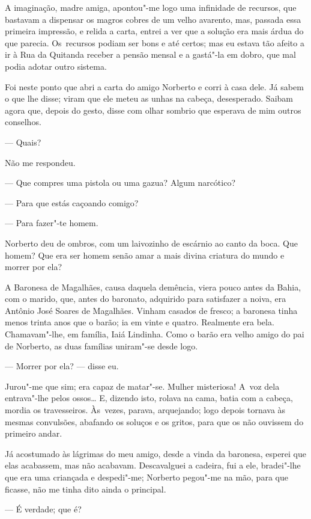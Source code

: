 \begin{linenumbers}
A imaginação, madre amiga, apontou"-me logo uma infinidade de recursos,
que bastavam a dispensar os magros cobres de um velho avarento, mas,
passada essa primeira impressão, e relida a carta, entrei a ver que a
solução era mais árdua do que parecia. Os~recursos podiam ser bons e até
certos; mas eu estava tão afeito a ir à Rua da Quitanda receber a pensão
mensal e a gastá"-la em dobro, que mal podia adotar outro sistema.

Foi neste ponto que abri a carta do amigo Norberto e corri à casa dele.
Já sabem o que lhe disse; viram que ele meteu as unhas na cabeça,
desesperado. Saibam agora que, depois do gesto, disse com olhar sombrio
que esperava de mim outros conselhos.

--- Quais?

Não me respondeu.

--- Que compres uma pistola ou uma gazua? Algum narcótico?

--- Para que estás caçoando comigo?

--- Para fazer"-te homem.

Norberto deu de ombros, com um laivozinho de escárnio ao canto da boca.
Que homem? Que era ser homem senão amar a mais divina criatura do mundo
e morrer por ela?

A Baronesa de Magalhães, causa daquela demência, viera pouco antes da
Bahia, com o marido, que, antes do baronato, adquirido para satisfazer a
noiva, era Antônio José Soares de Magalhães. Vinham casados de fresco; a
baronesa tinha menos trinta anos que o barão; ia em vinte e quatro.
Realmente era bela. Chamavam"-lhe, em família, Iaiá Lindinha. Como o
barão era velho amigo do pai de Norberto, as duas famílias uniram"-se
desde logo.

--- Morrer por ela? --- disse eu.

Jurou"-me que sim; era capaz de matar"-se. Mulher misteriosa! A~voz dela
entrava"-lhe pelos ossos\ldots{} E, dizendo isto, rolava na cama, batia com a
cabeça, mordia os travesseiros. Às~vezes, parava, arquejando; logo
depois tornava às mesmas convulsões, abafando os soluços e os gritos,
para que os não ouvissem do primeiro andar.

Já acostumado às lágrimas do meu amigo, desde a vinda da baronesa,
esperei que elas acabassem, mas não acabavam. Descavalguei a cadeira,
fui a ele, bradei"-lhe que era uma criançada e despedi"-me; Norberto
pegou"-me na mão, para que ficasse, não me tinha dito ainda o principal.

--- É verdade; que é?


\end{linenumbers}
